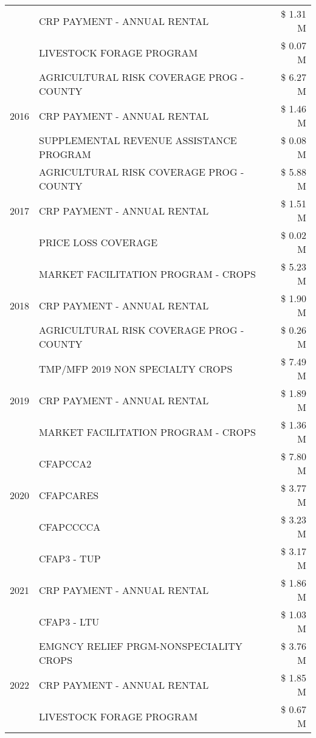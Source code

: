 \begin{tabular}{llr}
 & CRP PAYMENT - ANNUAL RENTAL & \$ 1.31 M \\
 & LIVESTOCK FORAGE PROGRAM & \$ 0.07 M \\
\cline{1-3}
\multirow[t]{3}{*}{2016} & AGRICULTURAL RISK COVERAGE PROG - COUNTY & \$ 6.27 M \\
 & CRP PAYMENT - ANNUAL RENTAL & \$ 1.46 M \\
 & SUPPLEMENTAL REVENUE ASSISTANCE PROGRAM & \$ 0.08 M \\
\cline{1-3}
\multirow[t]{3}{*}{2017} & AGRICULTURAL RISK COVERAGE PROG - COUNTY & \$ 5.88 M \\
 & CRP PAYMENT - ANNUAL RENTAL & \$ 1.51 M \\
 & PRICE LOSS COVERAGE & \$ 0.02 M \\
\cline{1-3}
\multirow[t]{3}{*}{2018} & MARKET FACILITATION PROGRAM - CROPS & \$ 5.23 M \\
 & CRP PAYMENT - ANNUAL RENTAL & \$ 1.90 M \\
 & AGRICULTURAL RISK COVERAGE PROG - COUNTY & \$ 0.26 M \\
\cline{1-3}
\multirow[t]{3}{*}{2019} & TMP/MFP 2019 NON SPECIALTY CROPS & \$ 7.49 M \\
 & CRP PAYMENT - ANNUAL RENTAL & \$ 1.89 M \\
 & MARKET FACILITATION PROGRAM - CROPS & \$ 1.36 M \\
\cline{1-3}
\multirow[t]{3}{*}{2020} & CFAPCCA2 & \$ 7.80 M \\
 & CFAPCARES & \$ 3.77 M \\
 & CFAPCCCCA & \$ 3.23 M \\
\cline{1-3}
\multirow[t]{3}{*}{2021} & CFAP3 - TUP & \$ 3.17 M \\
 & CRP PAYMENT - ANNUAL RENTAL & \$ 1.86 M \\
 & CFAP3 - LTU & \$ 1.03 M \\
\cline{1-3}
\multirow[t]{3}{*}{2022} & EMGNCY RELIEF PRGM-NONSPECIALITY CROPS & \$ 3.76 M \\
 & CRP PAYMENT - ANNUAL RENTAL & \$ 1.85 M \\
 & LIVESTOCK FORAGE PROGRAM & \$ 0.67 M \\
\cline{1-3}
\bottomrule
\end{tabular}

